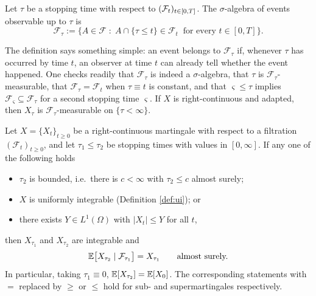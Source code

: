\begin{definition}\label{def:Ftau}
Let $\tau$ be a stopping time with respect to $(\mathcal{F}_t)_{t\in[0,T]}$. The $\sigma$-algebra of events observable up 
to $\tau$ is
\begin{equation}
\mathcal{F}_\tau := \bigl\{ A \in \mathcal{F} \;:\; A \cap \{\tau \leq t\} \in \mathcal{F}_t \ \text{ for every } t \in [0,T] \bigr\}.
\end{equation}
\end{definition}

The definition says something simple: an event belongs to $\mathcal{F}_\tau$ 
if, whenever $\tau$ has occurred by time $t$, an observer at time $t$ can already tell whether the 
event happened. One checks readily that $\mathcal{F}_\tau$ is indeed a $\sigma$-algebra, that 
$\tau$ is $\mathcal{F}_\tau$-measurable, that $\mathcal{F}_\tau = \mathcal{F}_t$ when 
$\tau \equiv t$ is constant, and that $\varsigma \leq \tau$ implies
$\mathcal{F}_\varsigma \subseteq \mathcal{F}_\tau$ for a second stopping time $\varsigma$. If $X$ is right-continuous and adapted, then
$X_\tau$ is $\mathcal{F}_\tau$-measurable on $\{\tau < \infty\}$.

\begin{theorem}\label{thm:optionalstopping}
Let $X = \{X_t\}_{t\geq0}$ be a 
right-continuous martingale with respect to a filtration $(\mathcal{F}_t)_{t\geq0}$, and let 
$\tau_1 \leq \tau_2$ be stopping times with values in $[0,\infty]$. If any one of the following 
holds
\begin{itemize}
    \item[i)] $\tau_2$ is bounded, i.e.\ there is $c<\infty$ with $\tau_2 \leq c$ almost surely;
    \item[ii)] $X$ is uniformly integrable (Definition \ref{def:ui}); or
    \item[iii)] there exists $Y \in L^1(\Omega)$ with $|X_{t}| \leq Y$ for all $t$,
\end{itemize}
then $X_{\tau_1}$ and $X_{\tau_2}$ are integrable and
\begin{equation}\label{eq:optionalstopping}
\mathbb{E}\bigl[ X_{\tau_2} \mid \mathcal{F}_{\tau_1} \bigr] = X_{\tau_1} \qquad \text{almost surely.}
\end{equation}
In particular, taking $\tau_1 \equiv 0$, $\mathbb{E}[X_{\tau_2}] = \mathbb{E}[X_0]$. The corresponding statements
with $=$ replaced by $\geq$ or $\leq$ hold for sub- and supermartingales respectively.
\qedopentext
\end{theorem}

